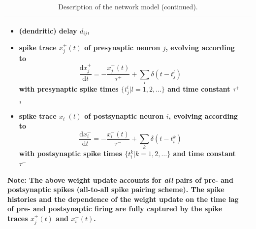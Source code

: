 \documentclass[10pt,a4paper,twoside,american]{article}
\newcommand{\diff}{\ensuremath{\text{d}}}
\begin{document}
\begin{table}[H]
\begin{tabular}{
  |@{\hspace*{\marg}}p{}@{\hspace*{\marg}}
  |@{\hspace*{\marg}}p{}@{\hspace*{\marg}}
  |}
\begin{itemize}
    \item (dendritic) delay $d_{ij}$,
    \item spike trace $x^+_j(t)$ of presynaptic neuron $j$, evolving according to
      \begin{equation*}
        \frac{\diff{}x^+_j}{\diff{}t}=-\frac{x^+_j(t)}{\tau^+}+\sum_l\delta(t-t_j^l)
      \end{equation*}
      with presynaptic spike times $\{t_j^l|l=1,2,\ldots\}$ and time constant $\tau^+$,
    \item spike trace $x^-_i(t)$ of postsynaptic neuron $i$, evolving according to
      \begin{equation*}
        \frac{\diff{}x^-_i}{\diff{}t}=-\frac{x^-_i(t)}{\tau^-}+\sum_k\delta(t-t_i^k)
      \end{equation*}
      with postsynaptic spike times $\{t_i^k|k=1,2,\ldots\}$ and time constant $\tau^-$
    \end{itemize}
    {\footnotesize Note: The above weight update accounts for \emph{all} pairs of pre- and postsynaptic spikes (all-to-all spike pairing scheme). The spike histories and the dependence of the weight update on the time lag of pre- and postsynaptic firing are fully captured by the spike traces $x^+_j(t)$ and $x^-_i(t)$.}
  \\
\hline 
\end{tabular}
\caption{Description of the network model (continued).}
\end{table}
\addtocounter{table}{-1}
\end{document}

